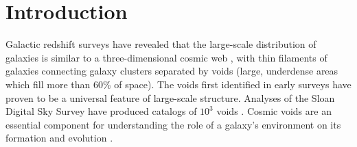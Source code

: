 %
%
\section{Introduction}




Galactic redshift surveys have revealed that the large-scale distribution of 
galaxies is similar to a three-dimensional cosmic web \citep{Bond96}, with thin 
filaments of galaxies connecting galaxy clusters separated by voids (large, 
underdense areas which fill more than 60\% of space).  The voids first 
identified in early surveys \citep[e.g.,][]{Gregory78,Kirshner81,deLapparent86} 
have proven to be a universal feature of large-scale structure.  Analyses of the 
Sloan Digital Sky Survey \citep{Abazajian09,Ahn12} have produced catalogs of 
$10^3$ voids \citep{Pan12,Sutter14}.  Cosmic voids are an essential component for 
understanding the role of a galaxy's environment on its formation and evolution 
\citep[see][for a review]{vandeWeygaert11}.  

